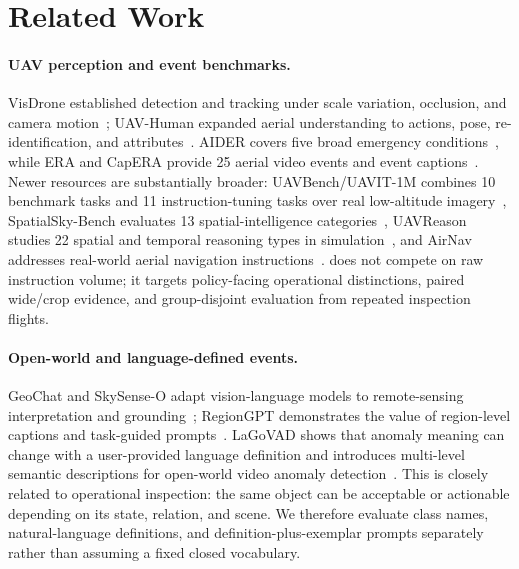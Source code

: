 \section{Related Work}
\label{sec:related}

\paragraph{UAV perception and event benchmarks.}
VisDrone established detection and tracking under scale variation, occlusion, and camera motion~\cite{zhu2018vision}; UAV-Human expanded aerial understanding to actions, pose, re-identification, and attributes~\cite{li2021uavhuman}. AIDER covers five broad emergency conditions~\cite{kyrkou2019aider}, while ERA and CapERA provide 25 aerial video events and event captions~\cite{mou2020era,papadopoulos2023capera}. Newer resources are substantially broader: UAVBench/UAVIT-1M combines 10 benchmark tasks and 11 instruction-tuning tasks over real low-altitude imagery~\cite{zhan2026uavbench}, SpatialSky-Bench evaluates 13 spatial-intelligence categories~\cite{zhang2026spatialsky}, UAVReason studies 22 spatial and temporal reasoning types in simulation~\cite{sun2026uavreason}, and AirNav addresses real-world aerial navigation instructions~\cite{cai2026airnav}. \dataset does not compete on raw instruction volume; it targets policy-facing operational distinctions, paired wide/crop evidence, and group-disjoint evaluation from repeated inspection flights.

\paragraph{Open-world and language-defined events.}
GeoChat and SkySense-O adapt vision-language models to remote-sensing interpretation and grounding~\cite{kuckreja2024geochat,zhu2025skysenseo}; RegionGPT demonstrates the value of region-level captions and task-guided prompts~\cite{guo2024regiongpt}. LaGoVAD shows that anomaly meaning can change with a user-provided language definition and introduces multi-level semantic descriptions for open-world video anomaly detection~\cite{liu2026lagovad}. This is closely related to operational inspection: the same object can be acceptable or actionable depending on its state, relation, and scene. We therefore evaluate class names, natural-language definitions, and definition-plus-exemplar prompts separately rather than assuming a fixed closed vocabulary.

